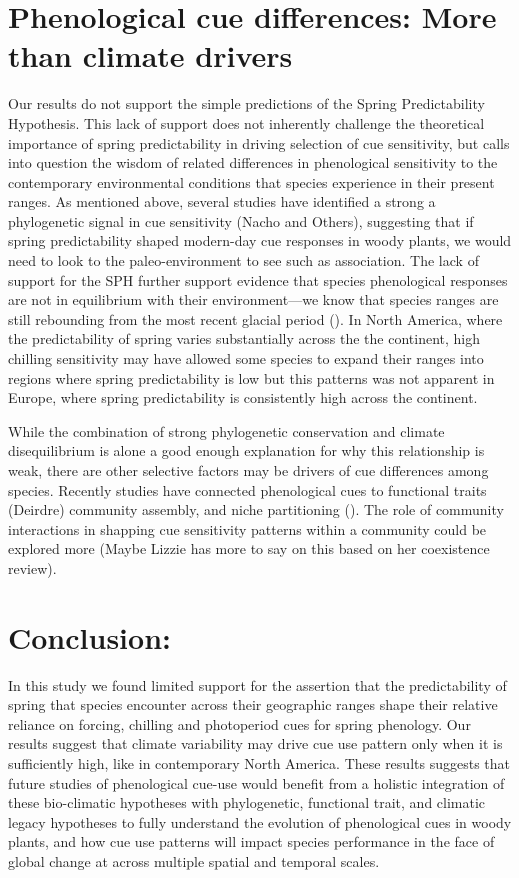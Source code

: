 \documentclass[12pt]{article}
\begin{document}
\section*{Phenological cue differences: More than climate drivers}

Our results do not support the simple predictions of the Spring Predictability Hypothesis. This lack of support does not inherently challenge the theoretical importance of spring predictability in driving selection of cue sensitivity, but calls into question the wisdom of related differences in phenological sensitivity to the contemporary environmental conditions that species experience in their present ranges. As mentioned above, several studies have identified a strong a phylogenetic signal in cue sensitivity (Nacho and Others), suggesting that if spring predictability shaped modern-day cue responses in woody plants, we would need to look to the paleo-environment to see such as association. The lack of support for the SPH further support evidence that species phenological responses are not in equilibrium with their environment---we know that species ranges are still rebounding from the most recent glacial period (). In North America, where the predictability of spring varies substantially across the the continent, high chilling sensitivity may have allowed some species to expand their ranges into regions where spring predictability is low but this patterns was not apparent in Europe, where spring predictability is consistently high across the continent.

While the combination of strong phylogenetic conservation and climate disequilibrium is alone a good enough explanation for why this relationship is weak, there are other selective factors may be drivers of cue differences among species. Recently studies have connected phenological cues to functional traits (Deirdre) community assembly, and niche partitioning (). The role of community interactions in shapping cue sensitivity patterns within a community could be explored more (Maybe Lizzie has more to say on this based on her coexistence review).

\section{Conclusion:}
In this study we found limited support for the assertion that the predictability of spring that species encounter across their geographic ranges shape their relative reliance on forcing, chilling and photoperiod cues for spring phenology. Our results suggest that climate variability may drive cue use pattern only when it is sufficiently high, like in contemporary North America. These results suggests that future studies of phenological cue-use would benefit from a holistic integration of these bio-climatic hypotheses with phylogenetic, functional trait, and climatic legacy hypotheses to fully understand the evolution of phenological cues in woody plants, and how cue use patterns will impact species performance in the face of global change at across multiple spatial and temporal scales.
\end{document}
